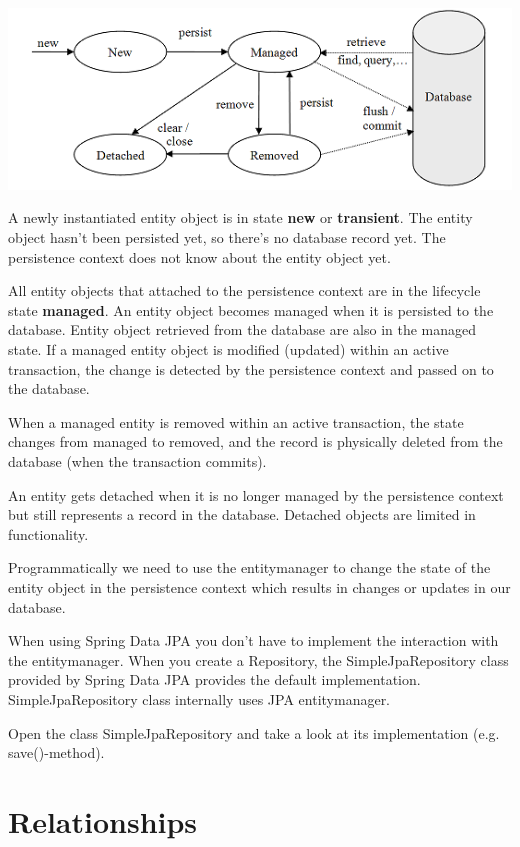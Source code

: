 \includegraphics[width=\textwidth]{./images/chapter6/entity_states}

A newly instantiated entity object is in state \textbf{new} or \textbf{transient}. The entity object hasn't been persisted yet, so there's no database record yet. The persistence context does not know about the entity object yet. 

All entity objects that attached to the persistence context are in the lifecycle state \textbf{managed}. An entity object becomes managed when it is persisted to the database. Entity object retrieved from the database are also in the managed state.
If a managed entity object is modified (updated) within an active transaction, the change is detected by the persistence context and passed on to the database.

When a managed entity is removed within an active transaction, the state changes from managed to removed, and the record is physically deleted from the database (when the transaction commits).

An entity gets detached when it is no longer managed by the persistence context but still represents a record in the database.
Detached objects are limited in functionality.

 
Programmatically we need to use the entitymanager to change the state of the entity object in the persistence context which results in changes or updates in our database. 

When using Spring Data JPA you don't have to implement the interaction with the entitymanager. When you create a Repository, the SimpleJpaRepository class provided by Spring Data JPA provides the default implementation. SimpleJpaRepository class internally uses JPA entitymanager.

\begin{oefening}
Open the class SimpleJpaRepository and take a look at its implementation (e.g. save()-method).
\end{oefening}


\section{Relationships}


